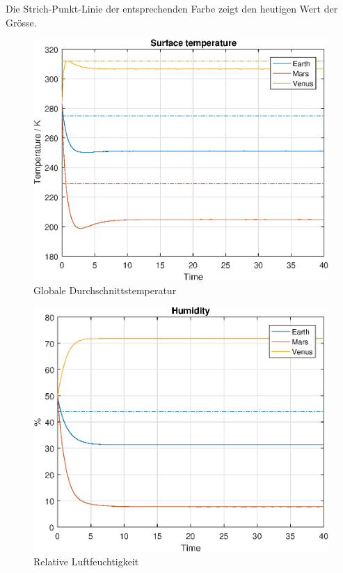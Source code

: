 \begin{refsection}
		Die Strich-Punkt-Linie der entsprechenden Farbe zeigt den heutigen Wert der Grösse. 

		\begin{figure}
			\center
			\includegraphics[height=0.45\textheight]{planeten/Matlab/figures/surfaceTemperature.eps}
			\caption{Globale Durchschnittstemperatur}
		\end{figure}
		
		\begin{figure}
			\center
			\includegraphics[height=0.45\textheight]{planeten/Matlab/figures/humidity.eps}
			\caption{Relative Luftfeuchtigkeit}
		\end{figure}
		

\end{refsection}
